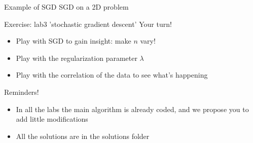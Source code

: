 \begin{frame}{Example of SGD}
    \centering
    SGD on a 2D problem
\end{frame}

\begin{frame}{Exercise: lab3 'stochastic gradient descent'}
    Your turn!

    \begin{itemize}
        \item  Play with SGD to gain insight: make $n$ vary!
        \item Play with the regularization parameter $\lambda$
        \item Play with the correlation of the data to see what's happening
    \end{itemize}

    \vspace{2em}

    Reminders!
    \begin{itemize}
        \item In all the labs the main algorithm is already coded, and we propose you to add little modifications
        \item All the solutions are in the solutions folder
    \end{itemize}
\end{frame}
